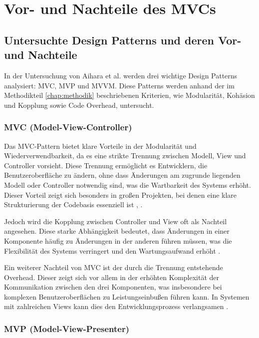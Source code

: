 \chapter{Vor- und Nachteile des MVCs}


\section{Untersuchte Design Patterns und deren Vor- und Nachteile}

In der Untersuchung von Aihara et al. \cite{aihara2012mvc} werden drei wichtige Design Patterns 
analysiert: MVC, MVP und MVVM. Diese Patterns werden anhand der 
im Methodikteil \ref{chap:methodik} beschriebenen Kriterien, wie Modularität, Kohäsion und 
Kopplung sowie Code Overhead, untersucht.

\subsection{MVC (Model-View-Controller)}

Das MVC-Pattern bietet klare Vorteile in der Modularität und 
Wiederverwendbarkeit, da es eine strikte Trennung zwischen 
Modell, View und Controller vorsieht. Diese Trennung ermöglicht 
es Entwicklern, die Benutzeroberfläche zu ändern, ohne dass 
Änderungen am zugrunde liegenden Modell oder Controller 
notwendig sind, was die Wartbarkeit des Systems erhöht. 
Dieser Vorteil zeigt sich besonders in großen Projekten, bei denen 
eine klare Strukturierung der Codebasis essenziell ist \cite{eudl63}, 
\cite{researchgate65}.

Jedoch wird die Kopplung zwischen Controller und View oft als 
Nachteil angesehen. Diese starke Abhängigkeit bedeutet, dass 
Änderungen in einer Komponente häufig zu Änderungen in der 
anderen führen müssen, was die Flexibilität des Systems verringert 
und den Wartungsaufwand erhöht \cite{researchgate65}.

Ein weiterer Nachteil von MVC ist der durch die Trennung 
entstehende Overhead. Dieser zeigt sich vor allem in der 
erhöhten Komplexität der Kommunikation zwischen den drei 
Komponenten, was insbesondere bei komplexen 
Benutzeroberflächen zu Leistungseinbußen führen kann. In 
Systemen mit zahlreichen Views kann dies den Entwicklungsprozess 
verlangsamen \cite{eudl63}.

\subsection{MVP (Model-View-Presenter)}

